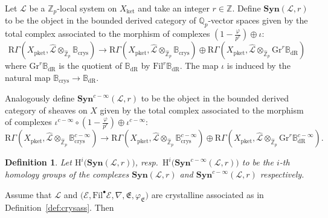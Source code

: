 \documentclass[asterisque,english]{smfart}
\newtheorem{definition}{Definition}[]
\begin{document}
Let $\mathcal{L}$ be a $\mathbb{Z}_p$-local system on $X_{\mathrm{ket}}$ and take an integer $r\in \mathbb{Z}$. Define $\mathbf{Syn}(\mathcal{L},r)$ to be the object in the bounded derived category of $\mathbb{Q}_p$-vector spaces  given by the total complex associated to the morphism of complexes  
$(1-\frac{\varphi}{p^r}) \oplus \iota $: $$ \mathrm{R}\Gamma\left(X_{\mathrm{pket}},\widehat{\mathcal{L}}\otimes_{\widehat{\mathbb{Z}}_p}  \mathbb{B}_{\mathrm{crys}}\right) \to   \mathrm{R}\Gamma\left(X_{\mathrm{pket}},\widehat{\mathcal{L}}\otimes_{\widehat{\mathbb{Z}}_p}  \mathbb{B}_{\mathrm{crys}}\right)  \oplus  \mathrm{R}\Gamma\left(X_{\mathrm{pket}},  \widehat{\mathcal{L}}\otimes_{\widehat{\mathbb{Z}}_p} \mathrm{Gr}^r \mathbb{B}_{\mathrm{dR}}\right)$$ where  $\mathrm{Gr}^r \mathbb{B}_{\mathrm{dR}}$ is the quotient of $\mathbb{B}_{\mathrm{dR}}$ by $\mathrm{Fil}^r \mathbb{B}_{\mathrm{dR}}$. The map $\iota$ is induced by the natural map $\mathbb{B}_{\mathrm{crys}}\to \mathbb{B}_{\mathrm{dR}}$.


Analogously define $\mathbf{Syn}^{c-\infty}(\mathcal{L},r)$ to be the object in the bounded derived category of sheaves on $X$ given by the total complex associated to the morphism of complexes $\iota^{c-\infty} \circ (1-\frac{\varphi}{p^r}) \oplus \iota^{c-\infty} $: $$\mathrm{R}\Gamma\left(X_{\mathrm{pket}},\widehat{\mathcal{L}}\otimes_{\widehat{\mathbb{Z}}_p}  \mathbb{B}_{\mathrm{crys}}^{c-\infty}\right) \to   \mathrm{R}\Gamma\left(X_{\mathrm{pket}},\widehat{\mathcal{L}}\otimes_{\widehat{\mathbb{Z}}_p}  \mathbb{B}_{\mathrm{crys}}^{c-\infty}\right)  \oplus  \mathrm{R}\Gamma\left(X_{\mathrm{pket}},  \widehat{\mathcal{L}}\otimes_{\widehat{\mathbb{Z}}_p} \mathrm{Gr}^r \mathbb{B}_{\mathrm{dR}}^{c-\infty}\right) .$$


\begin{definition} Let $\mathrm{H}^i\bigl(\mathbf{Syn}(\mathcal{L},r)\bigr)$, resp.~$\mathrm{H}^i\bigl(\mathbf{Syn}^{c-\infty}(\mathcal{L},r)\bigr)$ to be the $i$-th homology groups of the complexes $\mathbf{Syn}(\mathcal{L},r)$ and $\mathbf{Syn}^{c-\infty}(\mathcal{L},r)$ respectively. 
\end{definition}

Assume that   $\mathcal{L}$ and  $\bigl(\mathcal{E},\mathrm{Fil}^\bullet \mathcal{E}, \nabla,\mathfrak{E},\varphi_{\mathfrak{E}}\bigr) $ are crystalline associated as in Definition~\ref{def:crysass}. Then
\end{document}
